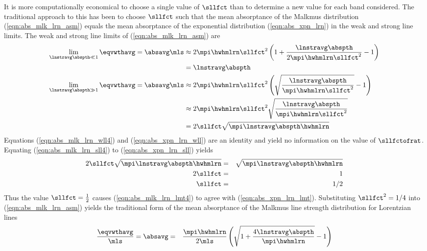 \documentclass[12pt]{article}
\begin{document}
It is more computationally economical to choose a single value of
$\sllfct$ than to determine a new value for each band considered.
The traditional approach to this has been to choose $\sllfct$ such
that the mean absorptance of the Malkmus distribution
(\ref{eqn:abs_mlk_lrn_asm}) equals the mean absorptance of the
exponential distribution (\ref{eqn:abs_xpn_lrn}) in the weak and
strong line limits. 
The weak and strong line limits of (\ref{eqn:abs_mlk_lrn_asm}) are
\begin{subequations}
\label{eqn:abs_mlk_lrn_lmt4}
\begin{align}
\label{eqn:abs_mlk_lrn_wll4}
\lim_{\lnstravg \abspth \ll 1} \eqvwthavg = \absavg \mls & \approx 
2 \mpi \hwhmlrn \sllfct^{2}
\left( 1 + \frac{\lnstravg \abspth}{2 \mpi \hwhmlrn \sllfct^{2}}
- 1 \right) \nonumber \\
& =
\lnstravg \abspth \\
\label{eqn:abs_mlk_lrn_sll4}
\lim_{\lnstravg \abspth \gg 1} \eqvwthavg = \absavg \mls & \approx 
2 \mpi \hwhmlrn \sllfct^{2}
\left( \sqrt{\frac{\lnstravg \abspth}{\mpi \hwhmlrn \sllfct^{2}}}
- 1 \right) \nonumber \\
& \approx
2 \mpi \hwhmlrn \sllfct^{2}
\sqrt{\frac{\lnstravg \abspth}{\mpi \hwhmlrn \sllfct^{2}}}
\nonumber \\
& =
2 \sllfct \sqrt{\mpi \lnstravg \abspth \hwhmlrn}
\end{align}
\end{subequations}
Equations (\ref{eqn:abs_mlk_lrn_wll4}) and (\ref{eqn:abs_xpn_lrn_wll})
are an identity and yield no information on the value of
$\sllfctofrat$.  
Equating (\ref{eqn:abs_mlk_lrn_sll4}) to (\ref{eqn:abs_xpn_lrn_sll})
yields
\begin{eqnarray}
2 \sllfct \sqrt{\mpi \lnstravg \abspth \hwhmlrn}
& = &
\sqrt{\mpi \lnstravg \abspth \hwhmlrn} \nonumber \\
2 \sllfct & = & 1 \nonumber \\
\sllfct & = & 1/2
\label{eqn:sll_fct_lmt}
\end{eqnarray}
Thus the value $\sllfct = \frac{1}{2}$ causes 
(\ref{eqn:abs_mlk_lrn_lmt4}) to agree with (\ref{eqn:abs_xpn_lrn_lmt}).
Substituting $\sllfct^{2} = 1/4$ into (\ref{eqn:abs_mlk_lrn_asm})
yields the traditional form of the mean absorptance of the Malkmus
line strength distribution for Lorentzian lines
\begin{eqnarray}
\frac{\eqvwthavg}{\mls} = \absavg 
& = & 
\frac{\mpi \hwhmlrn}{2 \mls}
\left( \sqrt{1 + \frac{4 \lnstravg \abspth}{\mpi \hwhmlrn}}
- 1 \right)
\label{eqn:abs_mlk_lrn_apx}
\end{eqnarray}
\end{document}

